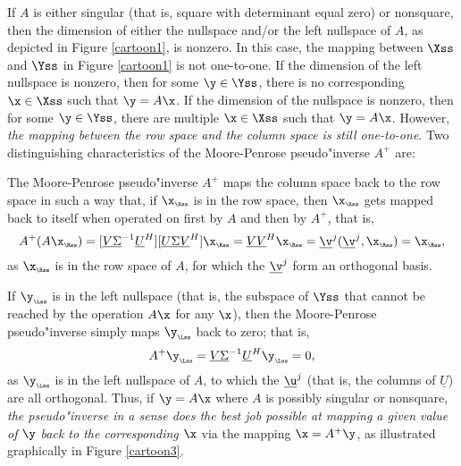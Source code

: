 If $A$ is either singular (that is, square with
determinant equal zero) or nonsquare, then the dimension of either the
nullspace and/or the left nullspace of $A$, as depicted in Figure \ref{cartoon1},
is nonzero.  In this case, the mapping between $\Xss$ and $\Yss$ in Figure
\ref{cartoon1} is not one-to-one.  If the dimension of the left nullspace is
nonzero, then for some $\y\in \Yss$, there is no corresponding $\x\in \Xss$
such that $\y=A\x$.  If the dimension of the nullspace is nonzero,
then for some $\y\in \Yss$, there are multiple $\x\in \Xss$ such that
$\y=A\x$.  However, 
{\it the mapping between the row space and the column space is still one-to-one}.
Two distinguishing characteristics
of the Moore-Penrose pseudo"inverse $A^{+}$ are:
\beginmylistb
\item The Moore-Penrose pseudo"inverse $A^{+}$ maps the column
space back to the row space in such a way that, if $\x_{\scriptscriptstyle \Rss}$ is in the row space, then 
$\x_{\scriptscriptstyle \Rss}$ gets mapped back to itself when operated on first by $A$ and then by $A^+$, that is,
\begin{equation*}
A^{+}(A\x_{\scriptscriptstyle \Rss})=
[\underline{V} \underline{\Sigma}^{-1} \underline{U}^{H}] [\underline{U \Sigma V}^{H}] \x_{\scriptscriptstyle \Rss}=
\underline{V V}^H \x_{\scriptscriptstyle \Rss} = \underline\v^j (\underline\v^j,\x_{\scriptscriptstyle \Rss})=\x_{\scriptscriptstyle \Rss},
\end{equation*} 
as $\x_{\scriptscriptstyle \Rss}$ is in the row space of $A$, for which the $\underline\v^j$
form an orthogonal basis.
\item If $\y_{\scriptscriptstyle \Lss}$ is in the left
nullspace (that is, the subspace of $\Yss$ that cannot be reached by the
operation $A\x$ for any $\x$), then the Moore-Penrose pseudo"inverse simply maps $\y_{\scriptscriptstyle \Lss}$
back to zero; that is, 
\begin{equation*}
A^{+}\y_{\scriptscriptstyle \Lss}=\underline{V} \underline{\Sigma}^{-1} \underline{U}^{H} \y_{\scriptscriptstyle \Lss} =0,
\end{equation*}
as $\y_{\scriptscriptstyle \Lss}$ is in the left nullspace of $A$, to which the $\underline\u^j$ (that is, the columns of $\underline U$)
are all orthogonal.
\endmylist
Thus, if $\y=A\x$ where $A$ is possibly singular or nonsquare, {\it the pseudo"inverse in a sense does the
best job possible at mapping a given value of $\y$ back to the
corresponding $\x$} via the mapping $\x=A^{+}\y$, as illustrated graphically in Figure \ref{cartoon3}.

